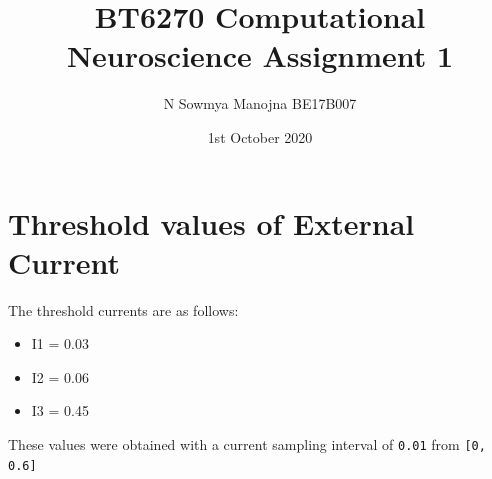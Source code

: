 \documentclass[12pt,a4paper]{article}
\author{\vspace{-4em}N Sowmya Manojna BE17B007\vspace{-4em}}
\date{1st October 2020}
\title{\vspace{-3em}BT6270 Computational Neuroscience Assignment 1}
\newcommand{\noi}{\noindent}
\def\tt#1{\texttt{#1}}
\begin{document}
		
	    
		

\vspace{-1em}
\maketitle
\vspace{-3em}

\section{Threshold values of External Current}
The threshold currents are as follows:
\vspace{-0.5em}
\begin{itemize}
	\itemsep0em
	\item I1 = 0.03
	\item I2 = 0.06
	\item I3 = 0.45
\end{itemize}

\noi
These values were obtained with a current sampling interval of \tt{0.01} from \tt{[0, 0.6]}
\end{document}
